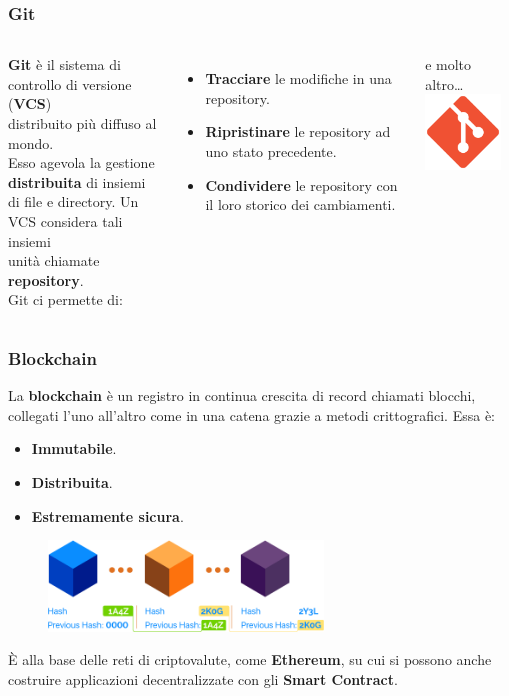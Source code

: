 \documentclass{beamer}
\begin{document}
\begin{frame}
	\frametitle{Git}

	\begin{columns}[T]
		\textbf{Git} è il sistema di controllo di versione (\textbf{VCS}) \\
		distribuito più diffuso al mondo. \\
		Esso agevola la gestione \textbf{distribuita} di insiemi\\di file e directory.
		Un VCS considera tali insiemi\\unità chiamate \textbf{repository}.\\
		Git ci permette di:
		\begin{itemize}
			\item \textbf{Tracciare} le modifiche in una repository.
			\item \textbf{Ripristinare} le repository ad uno stato precedente.
			\item \textbf{Condividere} le repository con il loro storico dei cambiamenti.
		\end{itemize}
		e molto altro\dots
		\hspace*{-2cm}
		\includegraphics[width=2cm]{figures/git.png}
	\end{columns}

\end{frame}

\begin{frame}
	\frametitle{Blockchain}
	La \textbf{blockchain} è un registro in continua crescita di
	record chiamati blocchi, collegati l'uno all'altro come in una
	catena grazie a metodi crittografici.
	Essa è:
	\begin{itemize}
		\item \textbf{Immutabile}.
		\item \textbf{Distribuita}.
		\item \textbf{Estremamente sicura}.
	\end{itemize}
	\begin{figure}
		\includegraphics[width=0.65\textwidth]{figures/blockchain.png}
	\end{figure}
	\pause
	È alla base delle reti di criptovalute, come \textbf{Ethereum},
	su cui si possono anche costruire applicazioni decentralizzate con gli
	\textbf{Smart Contract}.
\end{frame}
\end{document}
